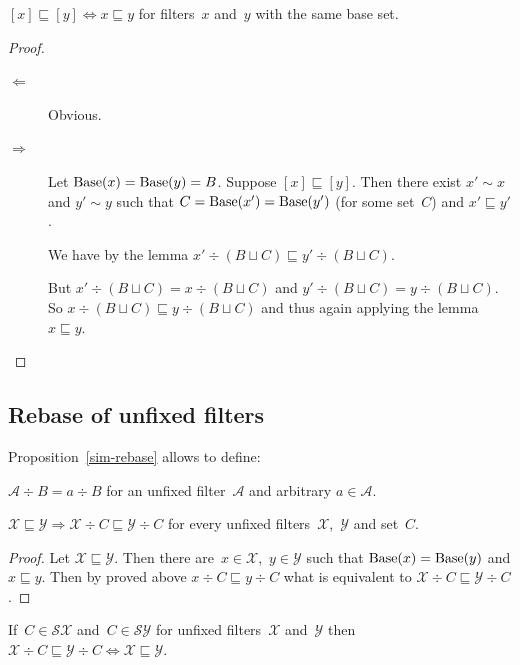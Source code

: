 \begin{thm}
$[x]\sqsubseteq[y] \Leftrightarrow x\sqsubseteq y$ for
filters~$x$ and~$y$ with the same base set.
\end{thm}

\begin{proof}
~
\begin{description}
\item[$\Leftarrow$] Obvious.

\item[$\Rightarrow$] Let $\operatorname{Base}(x)=\operatorname{Base}(y)=B$.
Suppose $[x]\sqsubseteq[y]$. Then
there exist $x'\sim x$ and $y'\sim y$ such that
$C=\operatorname{Base}(x')=\operatorname{Base}(y')$ (for some set~$C$) and
$x'\sqsubseteq y'$.

We have by the lemma
$x'\div(B\sqcup C)\sqsubseteq y'\div(B\sqcup C)$.

But $x'\div(B\sqcup C)=x\div(B\sqcup C)$ and
$y'\div(B\sqcup C)=y\div(B\sqcup C)$. So
$x\div(B\sqcup C)\sqsubseteq y\div(B\sqcup C)$ and thus again
applying the lemma $x\sqsubseteq y$.
\end{description}
\end{proof}

\subsection{Rebase of unfixed filters}

Proposition~\ref{sim-rebase} allows to define:

\begin{defn}
$\mathcal{A}\div B = a\div B$ for an unfixed
filter~$\mathcal{A}$ and arbitrary $a\in\mathcal{A}$.
\end{defn}

\begin{prop}
$\mathcal{X}\sqsubseteq\mathcal{Y} \Rightarrow
\mathcal{X}\div C\sqsubseteq\mathcal{Y}\div C$ for every
unfixed filters~$\mathcal{X}$,~$\mathcal{Y}$ and set~$C$.
\end{prop}

\begin{proof}
Let $\mathcal{X}\sqsubseteq\mathcal{Y}$. Then there
are~$x\in\mathcal{X}$,~$y\in\mathcal{Y}$ such that
$\operatorname{Base}(x)=\operatorname{Base}(y)$ and $x\sqsubseteq y$.
Then by proved above $x\div C\sqsubseteq y\div C$ what is
equivalent to
$\mathcal{X}\div C\sqsubseteq\mathcal{Y}\div C$.
\end{proof}

\begin{prop}
If~$C\in\mathscr{S}\mathcal{X}$
and~$C\in\mathscr{S}\mathcal{Y}$ for unfixed
filters~$\mathcal{X}$ and~$\mathcal{Y}$ then
$\mathcal{X}\div C\sqsubseteq\mathcal{Y}\div C \Leftrightarrow
\mathcal{X}\sqsubseteq\mathcal{Y}$.
\end{prop}

